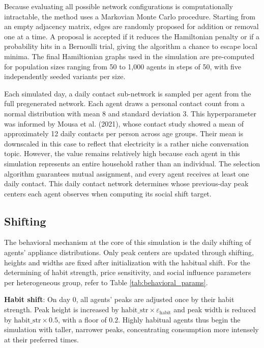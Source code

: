 \documentclass[11pt, a4paper]{article}
\begin{document}
Because evaluating all possible network configurations is computationally intractable, the method uses a Markovian Monte Carlo procedure. Starting from an empty adjacency matrix, edges are randomly proposed for addition or removal one at a time. A proposal is accepted if it reduces the Hamiltonian penalty or if a probability hits in a Bernoulli trial, giving the algorithm a chance to escape local minima. The final Hamiltionian graphs used in the simulation are pre-computed for population sizes ranging from 50 to 1,000 agents in steps of 50, with five independently seeded variants per size.

Each simulated day, a daily contact sub-network is sampled per agent from the full pregenerated network. Each agent draws a personal contact count from a normal distribution with mean 8 and standard deviation 3. This hyperparameter was informed by Mousa et al. (2021), whose contact study showed a mean of approximately 12 daily contacts per person across age groups. Their mean is downscaled in this case to reflect that electricity is a rather niche conversation topic. However, the value remains relatively high because each agent in this simulation represents an entire household rather than an individual. The selection algorithm guarantees mutual assignment, and every agent receives at least one daily contact. This daily contact network determines whose previous-day peak centers each agent observes when computing its social shift target.

\subsection{Shifting} \label{subs:shifting}

The behavioral mechanism at the core of this simulation is the daily shifting of agents' appliance distributions. Only peak centers are updated through shifting, heights and widths are fixed after initialization with the habitual shift. For the determining of habit strength, price sensitivity, and social influence parameters per heterogeneous group, refer to Table \ref{tab:behavioral_params}. 
\medskip

\textbf{Habit shift}: On day 0, all agents' peaks are adjusted once by their habit strength. Peak height is increased by $\text{habit\_str} \times \varepsilon_{\text{habit}}$ and peak width is reduced by $\text{habit\_str} \times 0.5$, with a floor of $0.2$. Highly habitual agents thus begin the simulation with taller, narrower peaks, concentrating consumption more intensely at their preferred times. 
\end{document}
